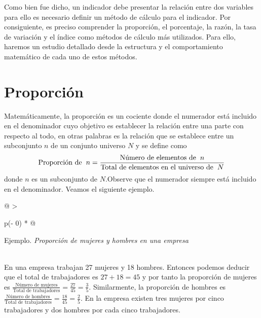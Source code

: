 \documentclass[
  11pt,
]{book}
\begin{document}
Como bien fue dicho, un indicador debe presentar la relación entre dos variables para ello es necesario definir un método de cálculo para el indicador. Por consiguiente, es preciso comprender la proporción, el porcentaje, la razón, la tasa de variación y el índice como métodos de cálculo más utilizados. Para ello, haremos un estudio detallado desde la estructura y el comportamiento matemático de cada uno de estos métodos.

\hypertarget{proporciuxf3n}{%
\chapter{Proporción}\label{proporciuxf3n}}

Matemáticamente, la proporción es un cociente donde el numerador está incluido en el denominador cuyo objetivo es establecer la relación entre una parte con respecto al todo, en otras palabras es la relación que se establece entre un subconjunto \(n\) de un conjunto universo \(N\) y se define como
\[\begin{equation}
\text{Proporción de}\hspace{2mm}n=\frac{\text{Número de elementos de}\hspace{2mm}n}{\text{Total de elementos en el universo de}\hspace{2mm} N}
\end{equation}\]
donde \(n\) es un subconjunto de \(N\).Observe que el numerador siempre está incluido en el denominador. Veamos el siguiente ejemplo.

\begin{longtable}[]{@{}
  >{\raggedright\arraybackslash}p{(\columnwidth - 0\tabcolsep) * }@{}}
\toprule
\begin{minipage}[b]{\linewidth}\raggedright
Ejemplo. \emph{Proporción de mujeres y hombres en una empresa}
\end{minipage} \\
\midrule
\endhead
En una empresa trabajan 27 mujeres y 18 hombres. Entonces podemos deducir que el total de trabajadores es \(27+18=45\) y por tanto la proporción de mujeres es \(\frac{\text{Número de mujeres}}{\text{Total de trabajadores}}=\frac{27}{45}=\frac{3}{5}\). Similarmente, la proporción de hombres es \(\frac{\text{Número de hombres}}{\text{Total de trabajadores}}=\frac{18}{45}=\frac{2}{5}\). En la empresa existen tres mujeres por cinco trabajadores y dos hombres por cada cinco trabajadores. \\
\bottomrule
\end{longtable}
\end{document}
